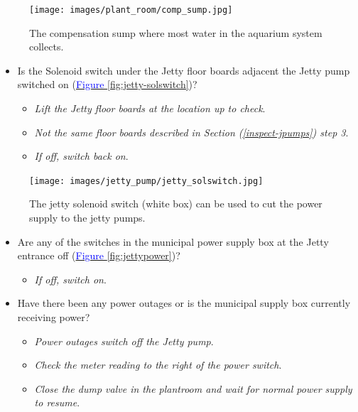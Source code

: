 \documentclass[
  12pt,
]{report}
\providecommand{\tightlist}{%
  \setlength{\itemsep}{0pt}\setlength{\parskip}{0pt}}\usepackage{longtable,booktabs,array}
\begin{document}
\begin{figure}[H]

{\centering \texttt{[image: images/plant\_room/comp\_sump.jpg]}

}

\caption{The compensation sump where most water in the aquarium system
collects.}

\end{figure}

\begin{itemize}
\tightlist
\item
  Is the Solenoid switch under the Jetty floor boards adjacent the Jetty
  pump switched on
  (\ul{\textcolor{blue}{Figure \ref{fig:jetty-solswitch}}})?

  \begin{itemize}
  \tightlist
  \item
    \emph{Lift the Jetty floor boards at the location up to check}.
  \item
    \emph{Not the same floor boards described in Section
    (\ul{\textcolor{blue}{\ref{inspect-jpumps}}}) step 3}.
  \item
    \emph{If off, switch back on}.
  \end{itemize}
\end{itemize}

\begin{figure}[H]

{\centering \texttt{[image: images/jetty\_pump/jetty\_solswitch.jpg]}

}

\caption{The jetty solenoid switch (white box) can be used to cut the
power supply to the jetty pumps.}

\end{figure}

\begin{itemize}
\tightlist
\item
  Are any of the switches in the municipal power supply box at the Jetty
  entrance off (\ul{\textcolor{blue}{Figure \ref{fig:jettypower}}})?

  \begin{itemize}
  \tightlist
  \item
    \emph{If off, switch on}.\\
  \end{itemize}
\item
  Have there been any power outages or is the municipal supply box
  currently receiving power?

  \begin{itemize}
  \tightlist
  \item
    \emph{Power outages switch off the Jetty pump}.
  \item
    \emph{Check the meter reading to the right of the power switch}.
  \item
    \emph{Close the dump valve in the plantroom and wait for normal
    power supply to resume}.
  \end{itemize}
\end{itemize}
\end{document}
